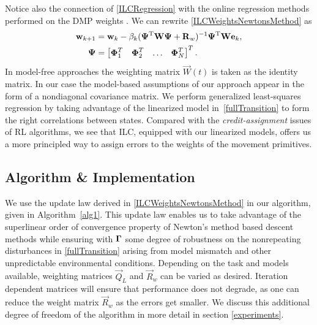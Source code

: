 %
%
\noindent Notice also the connection of \eqref{ILCRegression} with the online regression methods performed on the DMP weights \cite{Ijspeert13}. We can rewrite \eqref{ILCWeightsNewtonsMethod} as
%
\begin{equation}
\begin{aligned}
\boldsymbol{\mathrm{w}}_{k+1} &= \boldsymbol{\mathrm{w}}_k - \beta_k(\boldsymbol{\mathrm{\Psi}}^{\mathrm{T}}\boldsymbol{\mathrm{W}}\boldsymbol{\mathrm{\Psi}} + \boldsymbol{\mathrm{R}}_{w})^{-1}\boldsymbol{\mathrm{\Psi}}^{\mathrm{T}}\boldsymbol{\mathrm{W}}\boldsymbol{\mathrm{e}}_k, \\
\boldsymbol{\mathrm{\Psi}} &= \begin{bmatrix}
  \boldsymbol{\mathrm{\Phi}}_1^{T} & \boldsymbol{\mathrm{\Phi}}_2^{T} & \ldots & \boldsymbol{\mathrm{\Phi}}_N^{T}
 \end{bmatrix}^{T}.
\end{aligned}
\label{ILCRegression}
\end{equation}
%
%
In model-free approaches the weighting matrix $\vec{W}(t)$ is taken as the identity matrix. In our case the model-based assumptions of our approach appear in the form of a nondiagonal covariance matrix. We perform generalized least-squares regression by taking advantage of the linearized model in~\eqref{fullTransition} to form the right correlations between states. Compared with the \emph{credit-assignment} issues of RL algorithms, we see that ILC, equipped with our linearized models, offers us a more principled way to assign errors to the weights of the movement primitives.

\subsection{Algorithm \& Implementation}\label{algorithm}

We use the update law derived in \eqref{ILCWeightsNewtonsMethod} in our algorithm, given in Algorithm~\ref{alg1}. This update law enables us to take advantage of the superlinear order of convergence property of Newton's method based descent methods while ensuring with $\boldsymbol{\mathrm{\Gamma}}$ some degree of robustness on the nonrepeating disturbances in \eqref{fullTransition} arising from model mismatch and other unpredictable environmental conditions. Depending on the task and models available, weighting matrices $\vec{Q}_{L}$ and $\vec{R}_{w}$ can be varied as desired. Iteration dependent matrices will ensure that performance does not degrade, as one can reduce the weight matrix $\vec{R}_{w}$ as the errors get smaller. We discuss this additional degree of freedom of the algorithm in more detail in section \ref{experiments}.

